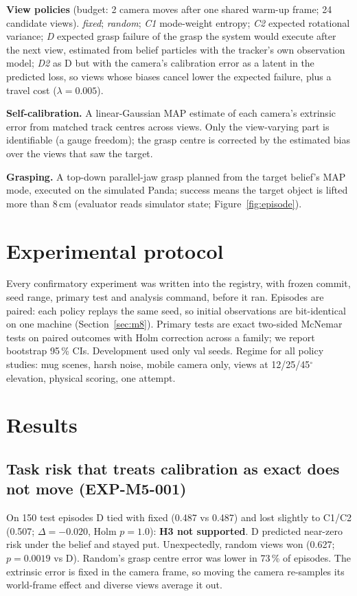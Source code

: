 \documentclass[10pt,twocolumn]{article}
\begin{document}
\textbf{View policies} (budget: 2 camera moves after one shared warm-up frame; 24 candidate views).
\emph{fixed}; \emph{random}; \emph{C1} mode-weight entropy; \emph{C2} expected rotational variance;
\emph{D} expected grasp failure of the grasp the system would execute after the next view,
estimated from belief particles with the tracker's own observation model; \emph{D2} as D but with
the camera's calibration error as a latent in the predicted loss, so views whose biases cancel
lower the expected failure, plus a travel cost ($\lambda=0.005$).

\textbf{Self-calibration.} A linear-Gaussian MAP estimate of each camera's extrinsic error from
matched track centres across views. Only the view-varying part is identifiable (a gauge freedom);
the grasp centre is corrected by the estimated bias over the views that saw the target.

\textbf{Grasping.} A top-down parallel-jaw grasp planned from the target belief's MAP mode,
executed on the simulated Panda; success means the target object is lifted more than 8\,cm
(evaluator reads simulator state; Figure~\ref{fig:episode}).

\section{Experimental protocol}
Every confirmatory experiment was written into the registry, with frozen commit, seed range,
primary test and analysis command, before it ran. Episodes are paired: each policy replays the
same seed, so initial observations are bit-identical on one machine (Section~\ref{sec:m8}). Primary tests are exact two-sided McNemar
tests on paired outcomes with Holm correction across a family; we report bootstrap 95\,\% CIs.
Development used only val seeds. Regime for all policy studies: mug scenes, harsh noise, mobile
camera only, views at 12/25/45$^\circ$ elevation, physical scoring, one attempt.

\section{Results}
\subsection{Task risk that treats calibration as exact does not move (EXP-M5-001)}
On 150 test episodes D tied with fixed (0.487 vs 0.487) and lost slightly to C1/C2 (0.507;
$\Delta=-0.020$, Holm $p=1.0$): \textbf{H3 not supported}. D predicted near-zero risk under the
belief and stayed put. Unexpectedly, random views won (0.627; $p=0.0019$ vs D). Random's grasp
centre error was lower in 73\,\% of episodes. The extrinsic error is fixed in the camera frame, so
moving the camera re-samples its world-frame effect and diverse views average it out.
\end{document}
